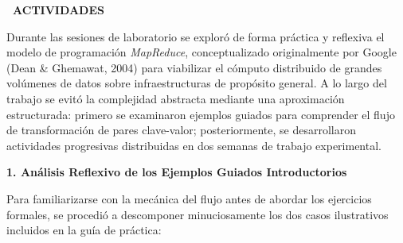 \documentclass[12pt,a4paper]{article}
\newcommand{\llav}{\symbol{60}\symbol{60}}
\newcommand{\rlav}{\symbol{62}\symbol{62}}
\newcommand{\marcador}[1]{\llav\ #1\ \rlav}
\newcommand{\seccion}[1]{%
  \vspace{0.6cm}%
  {\centering\bfseries\fontsize{12pt}{14pt}\selectfont\marcador{\MakeUppercase{#1}}\par}%
  \vspace{0.35cm}%
}
\begin{document}
\vspace{0.5cm}


\seccion{ACTIVIDADES}

Durante las sesiones de laboratorio se exploró de forma práctica y reflexiva el modelo de programación \textit{MapReduce}, conceptualizado originalmente por Google (Dean \& Ghemawat, 2004) para viabilizar el cómputo distribuido de grandes volúmenes de datos sobre infraestructuras de propósito general. A lo largo del trabajo se evitó la complejidad abstracta mediante una aproximación estructurada: primero se examinaron ejemplos guiados para comprender el flujo de transformación de pares clave-valor; posteriormente, se desarrollaron actividades progresivas distribuidas en dos semanas de trabajo experimental.

\vspace{0.2cm}
\noindent\textbf{1. Análisis Reflexivo de los Ejemplos Guiados Introductorios}

Para familiarizarse con la mecánica del flujo antes de abordar los ejercicios formales, se procedió a descomponer minuciosamente los dos casos ilustrativos incluidos en la guía de práctica:
\end{document}
